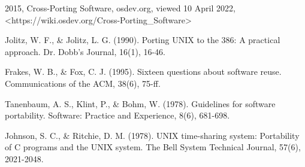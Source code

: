 \begin{flushleft}
\begin{thebibliography}{99}
    2015,
    Cross-Porting Software,
    osdev.org,
    viewed 10 April 2022,
    <https://wiki.osdev.org/Cross-Porting\_Software>

    Jolitz, W. F., \& Jolitz, L. G. (1990).
    Porting UNIX to the 386: A practical approach.
    Dr. Dobb's Journal, 16(1), 16-46.

    Frakes, W. B., \& Fox, C. J. (1995).
    Sixteen questions about software reuse.
    Communications of the ACM, 38(6), 75-ff.

    Tanenbaum, A. S., Klint, P., \& Bohm, W. (1978).
    Guidelines for software portability.
    Software: Practice and Experience, 8(6), 681-698.

    Johnson, S. C., \& Ritchie, D. M. (1978).
    UNIX time-sharing system: Portability of C programs and the UNIX system.
    The Bell System Technical Journal, 57(6), 2021-2048.

    \end{thebibliography}
\end{flushleft}
